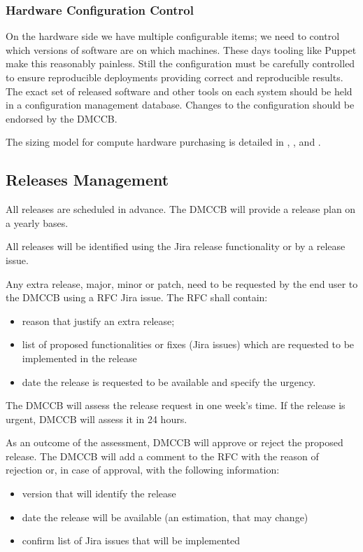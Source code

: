 \subsubsection{Hardware Configuration Control}

On the hardware side we have multiple configurable items; we need to control which versions of software are on which machines. These days tooling like Puppet make this reasonably painless. Still the configuration  must be carefully controlled to ensure reproducible deployments providing correct and reproducible results. The exact set of released software and other tools on each system should be held in a configuration management database.
Changes to the configuration should be endorsed by the DMCCB.

The sizing model for compute hardware purchasing is detailed in , , and .

\subsection {Releases Management } \label{sect:release}


All releases are scheduled in advance.
The DMCCB will provide a release plan on a yearly bases.

All releases will be identified using the Jira release functionality or by a release issue.

Any extra release, major, minor or patch, need to be requested by the end user to the DMCCB using a RFC Jira issue. The RFC shall contain:

\begin{itemize}
\item reason that justify an extra release;
\item list of proposed functionalities or fixes (Jira issues) which are requested to be implemented in the release
\item date the release is requested to be available and specify the urgency.
\end{itemize}

The DMCCB will assess the release request in one week's time. If the release is urgent, DMCCB will assess it in 24 hours.

As an outcome of the assessment, DMCCB will approve or reject the proposed release.
The DMCCB will add a comment to the RFC with the reason of rejection or, in case of approval, 
with the following information:

\begin{itemize}
\item version that will identify the release
\item date the release will be available (an estimation, that may change)
\item confirm list of Jira issues that will be implemented
\end{itemize}


